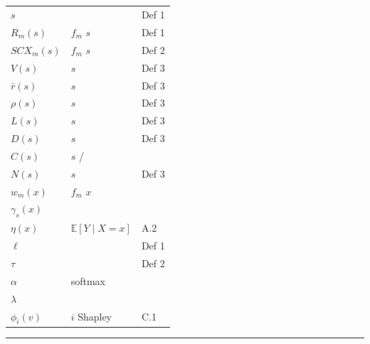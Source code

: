 \documentclass[
  12pt,
]{article}
\begin{document}
\subsection{}\label{ux9644ux5f55ux7b26ux53f7ux8868}

\begin{longtable}[]{@{}lll@{}}
\toprule\noalign{}
 &  &  \\
\midrule\noalign{}
\endhead
\bottomrule\noalign{}
\endlastfoot
\(s\) &  & Def 1 \\
\(R_m(s)\) &  \(f_m\)  \(s\)  & Def 1 \\
\(SCX_m(s)\) &  \(f_m\)  \(s\)  & Def 2 \\
\(V(s)\) &  \(s\)  & Def 3 \\
\(\bar{r}(s)\) &  \(s\)  & Def 3 \\
\(\rho(s)\) &  \(s\)  & Def 3 \\
\(L(s)\) &  \(s\)  & Def 3 \\
\(D(s)\) &  \(s\)  & Def 3 \\
\(C(s)\) &  \(s\)  /  &  \\
\(N(s)\) &  \(s\)  & Def 3 \\
\(w_m(x)\) &  \(f_m\)  \(x\)  &  \\
\(\gamma_s(x)\) &  &  \\
\(\eta(x)\) &  \(\mathbb{E}[Y \mid X=x]\) & A.2 \\
\(\ell\) &  & Def 1 \\
\(\tau\) &  & Def 2 \\
\(\alpha\) &  softmax  &  \\
\(\lambda\) &  &  \\
\(\phi_i(v)\) &  \(i\)  Shapley  & C.1 \\
\end{longtable}

\begin{center}\rule{0.5\linewidth}{0.5pt}\end{center}

\subsection{}\label{ux53c2ux8003ux6587ux732e}
\end{document}
